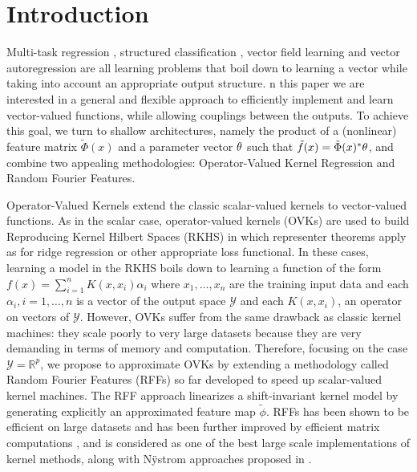 \documentclass[twocolumn]{article}
\begin{document}
\section{Introduction}
Multi-task regression \citep{Micchelli2005}, structured classification
\citep{Dinuzzo2011}, vector field learning \citep{Baldassare2012} and vector
autoregression \citep{Sindhwani2013,Lim2015} are all learning problems that
boil down to learning a vector while taking into account an appropriate output
structure.  n this paper we are interested in a general and flexible approach
to efficiently implement and learn vector-valued functions, while allowing
couplings between the outputs. To achieve this goal, we turn to shallow
architectures, namely the product of a (nonlinear) feature matrix
$\tilde{\Phi}(x)$ and a parameter vector $\theta$ such that $\tilde{f}(x) =
\tilde{\Phi}(x)^* \theta$, and combine two appealing methodologies:
Operator-Valued Kernel Regression and Random Fourier Features.
\par
Operator-Valued Kernels \citep{Micchelli2005,Carmeli2010,Alvarez2012} extend
the classic scalar-valued kernels to vector-valued functions. As in the scalar
case, operator-valued kernels (OVKs) are used to build Reproducing Kernel
Hilbert Spaces (RKHS) in which representer theorems apply as for ridge
regression or other appropriate loss functional. In these cases, learning a
model in the RKHS boils down to learning a function of the form
$f(x)=\sum_{i=1}^n K(x,x_i)\alpha_i$ where $x_1, \ldots, x_n$ are the training
input data and each $\alpha_i, i=1, \ldots, n$ is a vector of the output space
$\mathcal{Y}$ and each $K(x,x_i)$, an operator on vectors of $\mathcal{Y}$.
However, OVKs suffer from the same drawback as classic kernel machines: they
scale poorly to very large datasets because they are very demanding in terms of
memory and computation. Therefore, focusing on the case
$\mathcal{Y}=\mathbb{R}^p$, we propose to approximate OVKs by extending a
methodology called Random Fourier Features (RFFs) \citep{Rahimi2007, Le2013,
Alacarte, sriper2015, Bach2015, sutherland2015} so far developed to speed up
scalar-valued kernel machines. The RFF approach linearizes a shift-invariant
kernel model by generating explicitly an approximated feature map
$\tilde{\phi}$. RFFs has been shown to be efficient on large datasets and has
been further improved by efficient matrix computations
\citep[``FastFood'']{Le2013}, and is considered as one of the best large scale
implementations of kernel methods, along with N\"ystrom approaches proposed in
\cite{Yang2012}.
\par
\end{document}
